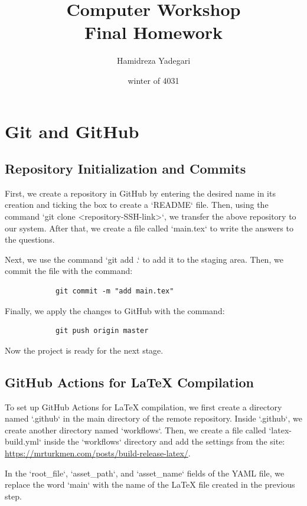 \documentclass{article}
\title{Computer Workshop \\ Final Homework}
\author{Hamidreza Yadegari}
\date{winter of 4031}
\begin{document}
\maketitle 
\thispagestyle{empty}
\newpage

\tableofcontents
{}
\setcounter{page}{1}
\newpage

\section{Git and GitHub}
    \subsection{Repository Initialization and Commits}
        First, we create a repository in GitHub by entering the desired name in its creation and ticking the box to create a `README` file. Then, using the command `git clone <repository-SSH-link>`, we transfer the above repository to our system. After that, we create a file called `main.tex` to write the answers to the questions. 

        Next, we use the command `git add .` to add it to the staging area. Then, we commit the file with the command:
        \begin{verbatim}
            git commit -m "add main.tex"
        \end{verbatim}
            Finally, we apply the changes to GitHub with the command:
        \begin{verbatim}
            git push origin master
        \end{verbatim}
        Now the project is ready for the next stage.
        \\
        \subsection{GitHub Actions for LaTeX Compilation}
            To set up GitHub Actions for LaTeX compilation, we first create a directory named `.github` in the main directory of the remote repository. Inside `.github`, we create another directory named `workflows`. Then, we create a file called `latex-build.yml` inside the `workflows` directory and add the settings from the site:
            \url{https://mrturkmen.com/posts/build-release-latex/}.
            
            In the `root\_file`, `asset\_path`, and `asset\_name` fields of the YAML file, we replace the word `main` with the name of the LaTeX file created in the previous step. 
            
\end{document}
